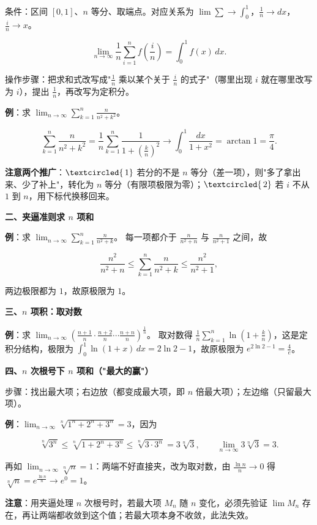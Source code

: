 \documentclass[11pt,openany,UTF8]{ctexbook}
\newcommand{\circled}[1]{\textcircled{\scriptsize\,#1}}
\begin{document}
条件：区间 $[0,1]$、$n$ 等分、取端点。对应关系为 $\lim\sum\to\int_0^1$，$\frac1n\to dx$，$\frac{i}{n}\to x$。

\[\lim_{n\to\infty}\frac1n\sum_{i=1}^{n}f\!\left(\frac{i}{n}\right)=\int_0^1 f(x)\,dx .\]

操作步骤：把求和式改写成"$\frac1n$ 乘以某个关于 $\frac in$ 的式子"（哪里出现 $i$ 就在哪里改写为 $i$），提出 $\frac1n$，再改写为定积分。

\textbf{例}：求 $\lim_{n\to\infty}\sum_{k=1}^{n}\frac{n}{n^{2}+k^{2}}$。

\[\sum_{k=1}^{n}\frac{n}{n^{2}+k^{2}}=\frac1n\sum_{k=1}^{n}\frac{1}{1+\left(\frac kn\right)^{2}}\to\int_0^1\frac{dx}{1+x^{2}}=\arctan 1=\frac{\pi}{4}.\]

\textbf{注意两个推广}：$\circled{1}$ 若分的不是 $n$ 等分（差一项），则"多了拿出来、少了补上"，转化为 $n$ 等分（有限项极限为零）；$\circled{2}$ 若 $i$ 不从 $1$ 到 $n$，用下标代换移回来。

\textbf{二、夹逼准则求 $n$ 项和}

\textbf{例}：求 $\lim_{n\to\infty}\sum_{k=1}^{n}\frac{n}{n^{2}+k}$。 每一项都介于 $\frac{n}{n^{2}+n}$ 与 $\frac{n}{n^{2}+1}$ 之间，故

\[\frac{n^{2}}{n^{2}+n}\le\sum_{k=1}^{n}\frac{n}{n^{2}+k}\le\frac{n^{2}}{n^{2}+1},\]

两边极限都为 $1$，故原极限为 $1$。

\textbf{三、$n$ 项积：取对数}

\textbf{例}：求 $\lim_{n\to\infty}\left(\frac{n+1}{n}\cdot\frac{n+2}{n}\cdots\frac{n+n}{n}\right)^{\frac1n}$。 取对数得 $\frac1n\sum_{k=1}^{n}\ln\left(1+\frac kn\right)$，这是定积分结构，极限为 $\int_0^1\ln(1+x)\,dx=2\ln 2-1$，故原极限为 $e^{2\ln 2-1}=\frac{4}{e}$。

\textbf{四、$n$ 次根号下 $n$ 项和（"最大的赢"）}

步骤：找出最大项；右边放（都变成最大项，即 $n$ 倍最大项）；左边缩（只留最大项）。

\textbf{例}：$\lim_{n\to\infty}\sqrt[n]{1^{n}+2^{n}+3^{n}}=3$，因为

\[\sqrt[n]{3^{n}}\le\sqrt[n]{1+2^{n}+3^{n}}\le\sqrt[n]{3\cdot 3^{n}}=3\sqrt[n]{3},\qquad \lim_{n\to\infty}3\sqrt[n]{3}=3 .\]

再如 $\lim_{n\to\infty}\sqrt[n]{n}=1$：两端不好直接夹，改为取对数，由 $\frac{\ln n}{n}\to 0$ 得 $\sqrt[n]{n}=e^{\frac{\ln n}{n}}\to e^{0}=1$。

\textbf{注意}：用夹逼处理 $n$ 次根号时，若最大项 $M_n$ 随 $n$ 变化，必须先验证 $\lim M_n$ 存在，再让两端都收敛到这个值；若最大项本身不收敛，此法失效。
\end{document}
